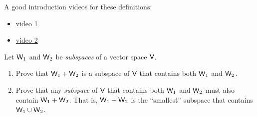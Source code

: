 \begin{note}
A good introduction videos for these definitions:
\begin{itemize}
    \item \href{https://youtu.be/Rcj1-E3SAhs?t=901}{video 1}
    \item \href{https://www.youtube.com/watch?v=qs240Jhl6Rs}{video 2}
\end{itemize}
\end{note}

\begin{exercise} \label{exercise 1.3.23}
Let \(\textsf{W}_1\) and \(\textsf{W}_2\) be \emph{subspaces} of a vector space \(\textsf{V}\).
\begin{enumerate}
    \item Prove that \(\textsf{W}_1 + \textsf{W}_2\) is a subspace of \(\textsf{V}\) that contains both \(\textsf{W}_1\) and \(\textsf{W}_2\).
    \item Prove that any \emph{subspace} of \(\textsf{V}\) that contains both \(\textsf{W}_1\) and \(\textsf{W}_2\) must also contain \(\textsf{W}_1 + \textsf{W}_2\). That is, \(\textsf{W}_1 + \textsf{W}_2\) is the ``smallest'' subspace that contains \(\textsf{W}_1 \cup \textsf{W}_2\).
\end{enumerate}
\end{exercise}

